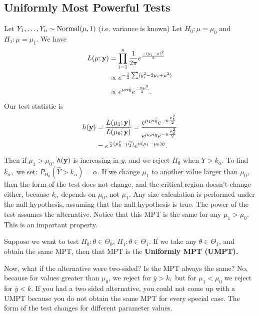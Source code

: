 
\subsection{Uniformly Most Powerful Tests}
\begin{eg}
Let $Y_1,\dots,Y_n\sim \operatorname*{Normal}(\mu,1)$ (i.e. variance is known) Let $H_0: \mu = \mu_0$ and $H_1:\mu = \mu_1$. We have
\begin{align*}
	L(\mu;\mathbf y)&=\prod^n_{i=1}\frac{1}{2\pi}e^{\frac{-(y_i-\mu)^2}{2}} \\
		  & \propto e^{-\frac{1}{2}\sum(y_i^2-2\mu_i+\mu^2)} \\
		  & \propto e^{\mu n \bar{y}}e^{\frac{-n\mu^2}{2}}
.\end{align*}
Our test statistic is 
\begin{align*}
h(\mathbf y)&=\frac{L(\mu_1;\mathbf y)}{L(\mu_0;\mathbf y)}=\frac{e^{\mu_1n\bar{y}}e^{-n\frac{\mu_1^2}{2}}}{e^{\mu_0n\bar{y}}e^{-n\frac{\mu_0^2}{2}}} \\
	      &=e^{\frac{n}{2}(\mu_0^2-\mu_1^2)}e^{n(\mu_1-\mu_0)\bar{y}}  
.\end{align*}
Then if $\mu_1>\mu_0$, $h(\mathbf y)$ is increasing in $\bar{y}$, and we reject $H_0$ when $\bar{Y}>k_\alpha$. To find $k_\alpha,$ we set: $P_{H_0}(\hat Y> k_\alpha)=\alpha$. If we change $\mu_1$ to another value larger than $\mu_0$, then the form of the test does not change, and the critical region doesn't change either, because $k_\alpha$ depends on $\mu_0$, not $\mu_1$. Any size calculation is performed under the null hypothesis, assuming that the null hypothesis is true. The power of the test assumes the alternative. Notice that this MPT is the same for any $\mu_1>\mu_0$. This is an important property.
\end{eg}

\begin{definition}
	Suppose we want to test $H_0: \theta\in\Theta_0$, $H_1:\theta\in \Theta_1$. If we take any $\theta\in \Theta_1$, and obtain the same MPT, then that MPT is the \textbf{Uniformly MPT (UMPT).} 
\end{definition}

Now, what if the alternative were two-sided? Is the MPT always the same? No, because for values greater than $\mu_0$, we reject for $\bar{y}>k,$ but for $\mu_1<\mu_0$ we reject for $\bar{y}<k$. If you had a two sided alternative, you could not come up with a UMPT because you do not obtain the same MPT for every special case. The form of the test changes for different parameter values. 


